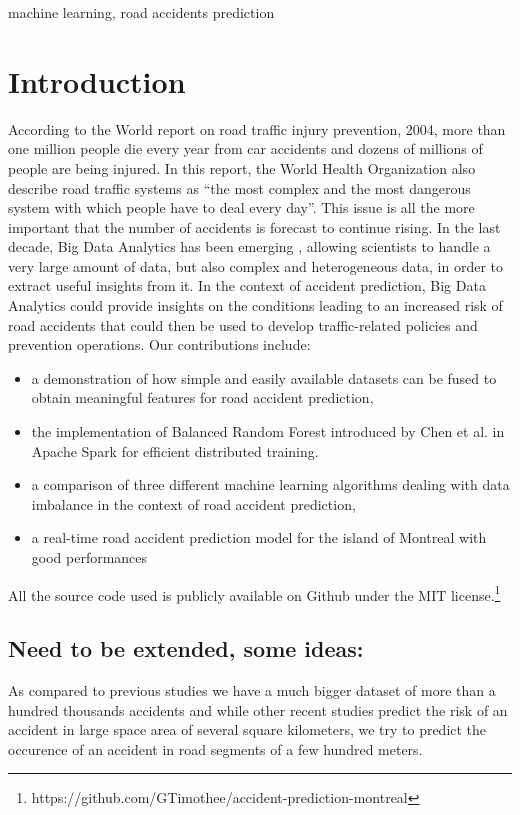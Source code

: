 \documentclass[conference]{IEEEtran}
\begin{document}
\begin{IEEEkeywords}
machine learning, road accidents prediction
\end{IEEEkeywords}

\section{Introduction}
According to the World report on road traffic injury prevention, 2004, more than one million people die every year from car accidents and dozens of millions of people are being injured\cite{Peden2004}.
In this report, the World Health Organization also describe road traffic systems as “the most complex and the most dangerous system with which people have to deal every day”.
This issue is all the more important that the number of accidents is forecast to continue rising.
In the last decade, Big Data Analytics has been emerging \cite{Gandomi2015}, allowing scientists to handle a very large amount of data, but also complex and heterogeneous data, in order to extract useful insights from it.
In the context of accident prediction, Big Data Analytics could provide insights on the conditions leading to an increased risk of road accidents that could then be used to develop traffic-related policies and prevention operations.
Our contributions include: 
\begin{itemize}
\item a demonstration of how simple and easily available datasets can be fused to obtain meaningful features for road accident prediction,
\item the implementation of Balanced Random Forest introduced by Chen et al.\cite{Chen2004} in Apache Spark for efficient distributed training.
\item a comparison of three different machine learning algorithms dealing with data imbalance in the context of road accident prediction,
\item a real-time road accident prediction model for the island of Montreal with good performances
\end{itemize}
All the source code used is publicly available on Github under the MIT license.\footnote{https://github.com/GTimothee/accident-prediction-montreal}

\subsection{Need to be extended, some ideas:}

  As compared to previous studies we have a much bigger dataset of more than a hundred thousands accidents and while other recent studies predict the risk  of an accident in large space area of several square kilometers, we try to predict the occurence of an accident in road segments of a few hundred meters.
\end{document}
